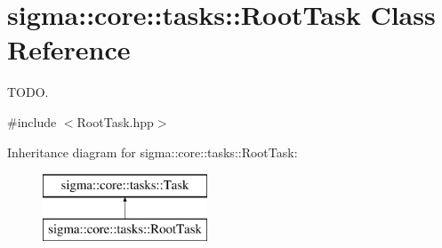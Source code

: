 \hypertarget{classsigma_1_1core_1_1tasks_1_1_root_task}{}\section{sigma\+:\+:core\+:\+:tasks\+:\+:Root\+Task Class Reference}
\label{classsigma_1_1core_1_1tasks_1_1_root_task}


T\+O\+D\+O.  




{\ttfamily \#include $<$Root\+Task.\+hpp$>$}

Inheritance diagram for sigma\+:\+:core\+:\+:tasks\+:\+:Root\+Task\+:\begin{figure}[H]
\begin{center}
\leavevmode
\includegraphics[height=2.000000cm]{classsigma_1_1core_1_1tasks_1_1_root_task}
\end{center}
\end{figure}
